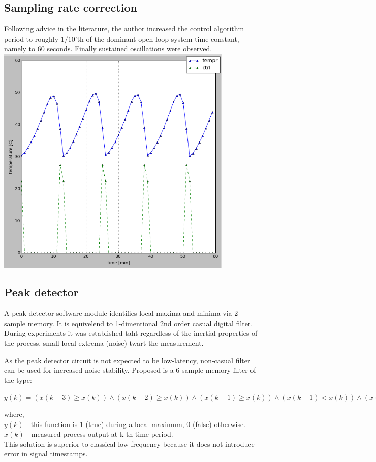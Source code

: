 \subsection{Sampling rate correction}
Following advice in the literature\cite{garipov-ident}, the author increased the control algorithm period to roughly $1/10$'th of the dominant open loop system time constant, namely to 60 seconds.
Finally sustained oscillations were observed.
\\
\includegraphics[width=0.85\textwidth]{../images/exp_relay_slow}~

\subsection{Peak detector}
A peak detector software module identifies local maxima and minima via 2 sample memory.
It is equivelend to 1-dimentional 2nd order casual digital filter.
During experiments it was established taht regardless of the inertial properties of the process, small local extrema (noise) twart the measurement.
\par
As the peak detector circuit is not expected to be low-latency, non-casual filter can be used for increased noise stability.
Proposed is a 6-sample memory filter of the type:

\par $
    y(k) = (x(k-3) \geq x(k)) \land (x(k-2) \geq x(k)) \land (x(k-1) \geq x(k)) \land
           (x(k+1) < x(k)) \land (x(k+2) < x(k)) \land (x(k+3) < x(k))
$ \par
where, \\
$y(k)$ - this function is 1 (true) during a local maximum, 0 (false) otherwise. \\
$x(k)$ - measured process output at k-th time period.
\\
This solution is superior to classical low-frequency because it does not introduce error in signal timestamps.
